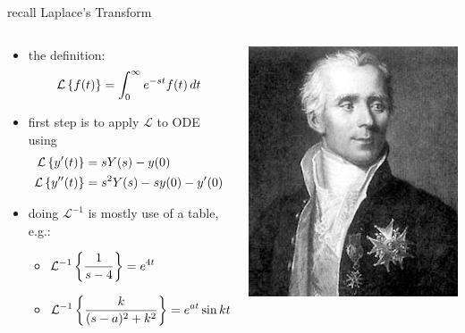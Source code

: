 \documentclass[urlcolor=blue,dvipsnames]{beamer}
\begin{document}
\begin{frame}{recall Laplace's Transform}

\begin{columns}
\begin{column}{0.77\textwidth}
\begin{itemize}
\item the definition:
    $$\mathcal{L}\left\{f(t)\right\} = \int_0^\infty e^{-st} f(t)\,dt$$
\item first step is to apply $\mathcal{L}$ to ODE using
\begin{align*}
\mathcal{L}\left\{y'(t)\right\} &= s Y(s) - y(0) \\
\mathcal{L}\left\{y''(t)\right\} &= s^2 Y(s) - s y(0) - y'(0)
\end{align*}
\item doing $\mathcal{L}^{-1}$ is mostly use of a table, e.g.:
    \begin{itemize}
    \item $\displaystyle \mathcal{L}^{-1}\left\{\frac{1}{s-4}\right\} = e^{4t}$
    \item $\displaystyle \mathcal{L}^{-1}\left\{\frac{k}{(s-a)^2+k^2}\right\} = e^{at} \sin{kt}$
    \end{itemize}
\end{itemize}
\end{column}
\begin{column}{0.23\textwidth}
\includegraphics[width=\textwidth]{figs/Laplace-sharp}


\end{column}
\end{columns}
\end{frame}
\end{document}
